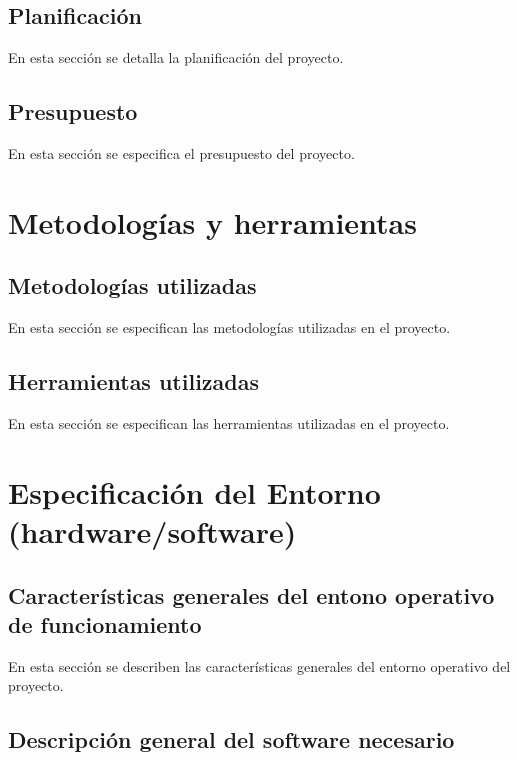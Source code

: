 \subsection{\textbf{Planificación}}

En esta sección se detalla la planificación del proyecto.

\subsection{\textbf{Presupuesto}}

En esta sección se especifica el presupuesto del proyecto.

\section{\textbf{Metodologías y herramientas}}

\subsection{\textbf{Metodologías utilizadas}}

En esta sección se especifican las metodologías utilizadas en el proyecto.

\subsection{\textbf{Herramientas utilizadas}}

En esta sección se especifican las herramientas utilizadas en el proyecto.

\section{\textbf{Especificación del Entorno (hardware/software)}}

\subsection{\textbf{Características generales del entono operativo de funcionamiento}}

En esta sección se describen las características generales del entorno operativo del proyecto.

\subsection{\textbf{Descripción general del software necesario}}

